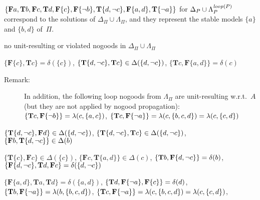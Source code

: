 \begin{Loesung}
{$\{\mathbf{F}a,\mathbf{T}b,\mathbf{F}c,\mathbf{T}d,
   \mathbf{F}\{c\},\mathbf{F}\{{\neg{b}}\},\mathbf{T}\{d,{\neg{c}}\},\mathbf{F}\{a,d\},\mathbf{T}\{{\neg{a}}\}\}$
for $\Delta_P\cup\Lambda_P^{\mathit{loop}(P)}$
correspond to the solutions of 
$\Delta_\Pi\cup\Lambda_\Pi$, 
and they represent the stable models $\{a\}$ and $\{b,d\}$ of~$\Pi$.
\begin{UList}
\item no unit-resulting or violated nogoods in $\Delta_\Pi\cup\Lambda_\Pi$
\item $\{\mathbf{F}\{c\},\mathbf{T}c\}=\delta(\{c\})$,\newline
      $\{\mathbf{T}\{d,{\neg{c}}\},\mathbf{T}c\}\in\Delta(\{d,{\neg{c}}\})$,\newline
      $\{\mathbf{T}c,\mathbf{F}\{a,d\}\}=\delta(c)$
      \begin{description}
      \item[Remark:]
      In addition, the following loop nogoods from $\Lambda_\Pi$ are unit-resulting w.r.t.~$A$
      (but they are not applied by nogood propagation):\newline
      $\{\mathbf{T}c,\mathbf{F}\{{\neg{b}}\}\}=\lambda(c,\{a,c\})$,\newline
      $\{\mathbf{T}c,\mathbf{F}\{{\neg{a}}\}\}=\lambda(c,\{b,c,d\})=\lambda(c,\{c,d\})$
      \end{description}
\item $\{\mathbf{T}\{d,{\neg{c}}\},\mathbf{F}d\}\in\Delta(\{d,{\neg{c}}\})$,\newline
      $\{\mathbf{T}\{d,{\neg{c}}\},\mathbf{T}c\}\in\Delta(\{d,{\neg{c}}\})$,\newline
      $\{\mathbf{F}b,\mathbf{T}\{d,{\neg{c}}\}\}\in\Delta(b)$
\item $\{\mathbf{T}\{c\},\mathbf{F}c\}\in\Delta(\{c\})$,\newline
      $\{\mathbf{F}c,\mathbf{T}\{a,d\}\}\in\Delta(c)$,\newline
      $\{\mathbf{T}b,\mathbf{F}\{d,{\neg{c}}\}\}=\delta(b)$,\newline
      $\{\mathbf{F}\{d,{\neg{c}}\},\mathbf{T}d,\mathbf{F}c\}=\delta(\{d,{\neg{c}}\})$
\item $\{\mathbf{F}\{a,d\},\mathbf{T}a,\mathbf{T}d\}=\delta(\{a,d\})$,\newline
      $\{\mathbf{T}d,\mathbf{F}\{{\neg{a}}\},\mathbf{F}\{c\}\}=\delta(d)$,\newline
      $\{\mathbf{T}b,\mathbf{F}\{{\neg{a}}\}\}=\lambda(b,\{b,c,d\})$,\newline
      $\{\mathbf{T}c,\mathbf{F}\{{\neg{a}}\}\}=\lambda(c,\{b,c,d\})=\lambda(c,\{c,d\})$,\newline

\end{UList}}
\end{Loesung}
